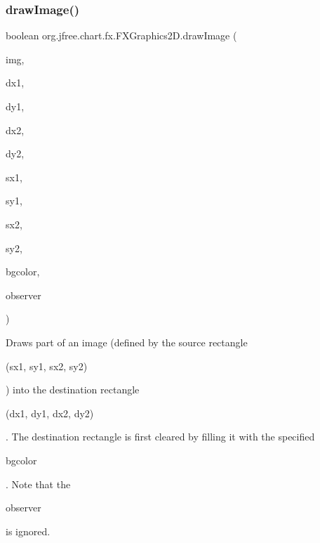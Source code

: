 \subsubsection{\texorpdfstring{draw\+Image()}{drawImage()}\hspace{0.1cm}{\footnotesize\ttfamily [6/8]}}
{\footnotesize\ttfamily boolean org.\+jfree.\+chart.\+fx.\+F\+X\+Graphics2\+D.\+draw\+Image (\begin{DoxyParamCaption}\item[{Image}]{img,  }\item[{int}]{dx1,  }\item[{int}]{dy1,  }\item[{int}]{dx2,  }\item[{int}]{dy2,  }\item[{int}]{sx1,  }\item[{int}]{sy1,  }\item[{int}]{sx2,  }\item[{int}]{sy2,  }\item[{Color}]{bgcolor,  }\item[{Image\+Observer}]{observer }\end{DoxyParamCaption})}

Draws part of an image (defined by the source rectangle 
\begin{DoxyCode}
(sx1, sy1, sx2, sy2) 
\end{DoxyCode}
 ) into the destination rectangle 
\begin{DoxyCode}
(dx1, dy1, dx2, dy2) 
\end{DoxyCode}
 . The destination rectangle is first cleared by filling it with the specified
\begin{DoxyCode}
bgcolor 
\end{DoxyCode}
 . Note that the
\begin{DoxyCode}
observer 
\end{DoxyCode}
 is ignored.


